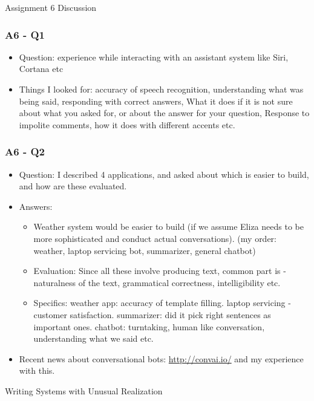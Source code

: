 \documentclass{beamer}
\begin{document}
\begin{frame}
\centering
\Large Assignment 6 Discussion
\end{frame}

\begin{frame}
\frametitle{A6 - Q1}
\begin{itemize}
\item Question: experience while interacting with an assistant system like Siri, Cortana etc
\item Things I looked for: accuracy of speech recognition, understanding what was being said, responding with correct answers, What it does if it is not sure about what you asked for, or about the answer for your question, Response to impolite comments, how it does with different accents etc. 
\end{itemize}
\end{frame}

\begin{frame}
\frametitle{A6 - Q2}
\begin{itemize}
\item Question: I described 4 applications, and asked about which is easier to build, and how are these evaluated.
\item Answers:
\begin{itemize}
\item Weather system would be easier to build (if we assume Eliza needs to be more sophisticated and conduct actual conversations). (my order: weather, laptop servicing bot, summarizer, general chatbot)
\item Evaluation: Since all these involve producing text, common part is - naturalness of the text, grammatical correctness, intelligibility etc. 
\item Specifics: weather app: accuracy of template filling. laptop servicing - customer satisfaction. summarizer: did it pick right sentences as important ones. chatbot: turntaking, human like conversation, understanding what we said etc. 
\end{itemize} \pause
\item Recent news about conversational bots: \url{http://convai.io/} and my experience with this. 
\end{itemize}
\end{frame}

\begin{frame}
\centering
\Large Writing Systems with Unusual Realization
\end{frame}
\end{document}
